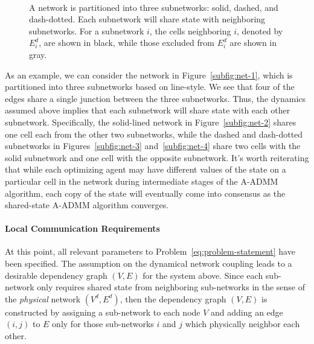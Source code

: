 \begin{figure}
	 \hfill
	\\
	 \hfill
	\label{fig:net-example}
	\caption{A network is partitioned into three subnetworks: solid, dashed, and dash-dotted. Each subnetwork will share state with neighboring subnetworks. For a subnetwork $i$, the cells neighboring $i$, denoted by $E^d_i$, are shown in black, while those excluded from $E^d_i$ are shown in gray.}
\end{figure}

As an example, we can consider the network in Figure~\ref{subfig:net-1}, which is partitioned into three subnetworks based on line-style. We see that four of the edges share a single junction between the three subnetworks. Thus, the dynamics assumed above implies that each subnetwork will share state with each other subnetwork. Specifically, the solid-lined network in Figure~\ref{subfig:net-2} shares one cell each from the other two subnetworks, while the dashed and dash-dotted subnetworks in Figures~\ref{subfig:net-3} and~\ref{subfig:net-4} share two cells with the solid subnetwork and one cell with the opposite subnetwork. It's worth reiterating that while each optimizing agent may have different values of the state on a particular cell in the network during intermediate stages of the A-ADMM algorithm, each copy of the state will eventually come into consensus as the shared-state A-ADMM algorithm converges.

\paragraph*{Local Communication Requirements}

At this point, all relevant parameters to Problem~\eqref{eq:problem-statement} have been specified. The assumption on the dynamical network coupling leads to a desirable dependency graph $\left(V,E\right)$ for the system above. Since each sub-network only requires shared state from neighboring sub-networks in the sense of the \emph{physical} network $\left(V^d,E^d\right)$, then the dependency graph $\left(V,E\right)$ is constructed by assigning a sub-network to each node $V$ and adding an edge $\left(i,j\right)$ to $E$ only for those sub-networks $i$ and $j$ which physically neighbor each other. 

